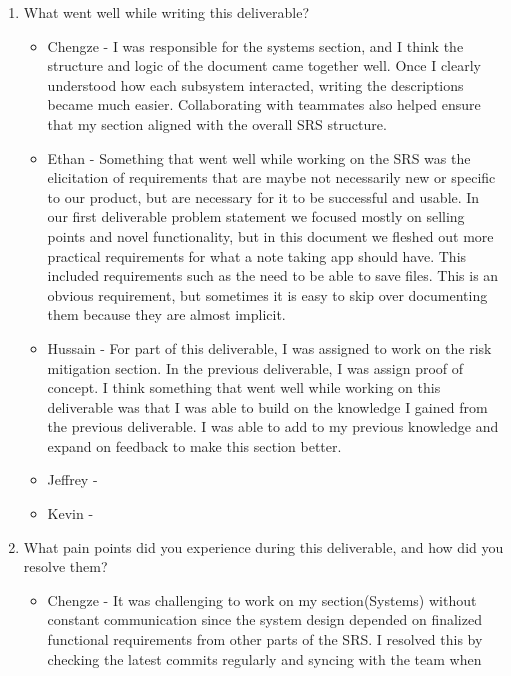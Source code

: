 \begin{enumerate}
  \item What went well while writing this deliverable?
  \begin{itemize}
        \item Chengze - I was responsible for the systems section, and 
        I think the structure and logic of the document came together 
        well. Once I clearly understood how each subsystem interacted, 
        writing the descriptions became much easier. Collaborating with 
        teammates also helped ensure that my section aligned with the 
        overall SRS structure.
        \item Ethan - Something that went well while working on the SRS was the
          elicitation of requirements that are maybe not necessarily new or
          specific to our product, but are necessary for it to be successful
          and usable. In our first deliverable problem statement we focused
          mostly on selling points and novel functionality, but in this
          document we fleshed out more practical requirements for what a note
          taking app should have. This included requirements such as the need
          to be able to save files. This is an obvious requirement, but
          sometimes it is easy to skip over documenting them because they are
          almost implicit.
        \item Hussain - For part of this deliverable, I was assigned to work on
         the risk mitigation section. In the previous deliverable, I was assign
         proof of concept. I think something that went well while working on
         this deliverable was that I was able to build on the knowledge I
         gained from the previous deliverable. I was able to add to my previous
         knowledge and expand on feedback to make this section better.
        \item Jeffrey - 
        \item Kevin - 
  \end{itemize} 
  \item What pain points did you experience during this deliverable, and how did
  you resolve them?
  \begin{itemize}
        \item Chengze - It was challenging to work on my section(Systems) without 
        constant communication since the system design depended on finalized 
        functional requirements from other parts of the SRS. I resolved this 
        by checking the latest commits regularly and syncing with the team when 

\end{itemize}
\end{enumerate}

